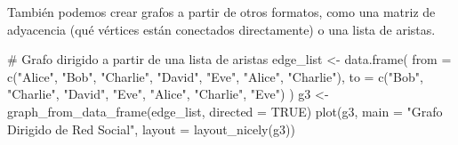 \documentclass[
  spanish,
  letterpaper,
  DIV=11,
  numbers=noendperiod]{scrreprt}
\newenvironment{Shaded}{\begin{snugshade}}{\end{snugshade}}
\newcommand{\AttributeTok}[1]{\textcolor[rgb]{0.40,0.45,0.13}{#1}}
\newcommand{\CommentTok}[1]{\textcolor[rgb]{0.37,0.37,0.37}{#1}}
\newcommand{\ConstantTok}[1]{\textcolor[rgb]{0.56,0.35,0.01}{#1}}
\newcommand{\DecValTok}[1]{\textcolor[rgb]{0.68,0.00,0.00}{#1}}
\newcommand{\FunctionTok}[1]{\textcolor[rgb]{0.28,0.35,0.67}{#1}}
\newcommand{\NormalTok}[1]{\textcolor[rgb]{0.00,0.23,0.31}{#1}}
\newcommand{\OtherTok}[1]{\textcolor[rgb]{0.00,0.23,0.31}{#1}}
\newcommand{\SpecialCharTok}[1]{\textcolor[rgb]{0.37,0.37,0.37}{#1}}
\newcommand{\StringTok}[1]{\textcolor[rgb]{0.13,0.47,0.30}{#1}}
\begin{document}
También podemos crear grafos a partir de otros formatos, como una matriz
de adyacencia (qué vértices están conectados directamente) o una lista
de aristas.

\begin{Shaded}
\end{Shaded}

\begin{Shaded}
\begin{Highlighting}[]
\CommentTok{\# Grafo dirigido a partir de una lista de aristas}
\NormalTok{edge\_list }\OtherTok{\textless{}{-}} \FunctionTok{data.frame}\NormalTok{(}
  \AttributeTok{from =} \FunctionTok{c}\NormalTok{(}\StringTok{"Alice"}\NormalTok{, }\StringTok{"Bob"}\NormalTok{, }\StringTok{"Charlie"}\NormalTok{, }\StringTok{"David"}\NormalTok{, }\StringTok{"Eve"}\NormalTok{, }\StringTok{"Alice"}\NormalTok{, }\StringTok{"Charlie"}\NormalTok{),}
  \AttributeTok{to =} \FunctionTok{c}\NormalTok{(}\StringTok{"Bob"}\NormalTok{, }\StringTok{"Charlie"}\NormalTok{, }\StringTok{"David"}\NormalTok{, }\StringTok{"Eve"}\NormalTok{, }\StringTok{"Alice"}\NormalTok{, }\StringTok{"Charlie"}\NormalTok{, }\StringTok{"Eve"}\NormalTok{)}
\NormalTok{)}
\NormalTok{g3 }\OtherTok{\textless{}{-}} \FunctionTok{graph\_from\_data\_frame}\NormalTok{(edge\_list, }\AttributeTok{directed =} \ConstantTok{TRUE}\NormalTok{)}
\FunctionTok{plot}\NormalTok{(g3, }\AttributeTok{main =} \StringTok{"Grafo Dirigido de Red Social"}\NormalTok{, }\AttributeTok{layout =} \FunctionTok{layout\_nicely}\NormalTok{(g3))}
\end{Highlighting}
\end{Shaded}
\end{document}
